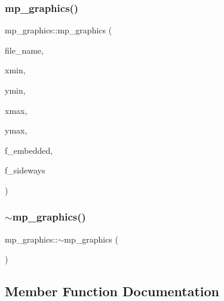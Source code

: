 \subsubsection{\texorpdfstring{mp\+\_\+graphics()}{mp\_graphics()}\hspace{0.1cm}{\footnotesize\ttfamily [2/2]}}
{\footnotesize\ttfamily mp\+\_\+graphics\+::mp\+\_\+graphics (\begin{DoxyParamCaption}\item[{const char $\ast$}]{file\+\_\+name,  }\item[{\mbox{\hyperlink{galois_8h_a09fddde158a3a20bd2dcadb609de11dc}{I\+NT}}}]{xmin,  }\item[{\mbox{\hyperlink{galois_8h_a09fddde158a3a20bd2dcadb609de11dc}{I\+NT}}}]{ymin,  }\item[{\mbox{\hyperlink{galois_8h_a09fddde158a3a20bd2dcadb609de11dc}{I\+NT}}}]{xmax,  }\item[{\mbox{\hyperlink{galois_8h_a09fddde158a3a20bd2dcadb609de11dc}{I\+NT}}}]{ymax,  }\item[{\mbox{\hyperlink{galois_8h_a09fddde158a3a20bd2dcadb609de11dc}{I\+NT}}}]{f\+\_\+embedded,  }\item[{\mbox{\hyperlink{galois_8h_a09fddde158a3a20bd2dcadb609de11dc}{I\+NT}}}]{f\+\_\+sideways }\end{DoxyParamCaption})}

\mbox{\label{classmp__graphics_ac0f9687c149d5579c95a32b07aa69683}} 
\subsubsection{\texorpdfstring{$\sim$mp\+\_\+graphics()}{~mp\_graphics()}}
{\footnotesize\ttfamily mp\+\_\+graphics\+::$\sim$mp\+\_\+graphics (\begin{DoxyParamCaption}{ }\end{DoxyParamCaption})}



\subsection{Member Function Documentation}
\mbox{\label{classmp__graphics_a52ca0d0e39640fe15c6a8bd8633c9e5a}} 
